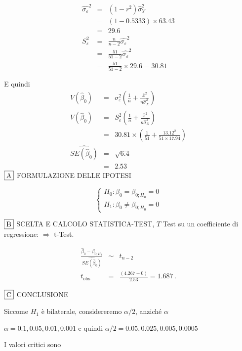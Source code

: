 \documentclass[
  11pt,
]{book}
\theoremstyle{mytheoremstyle}
\theoremstyle{mydefstyle}
\newenvironment{sol}
  {
  \begin{tcolorbox}[enhanced,breakable,arc=0.1mm,boxrule=1pt,colback=white,colframe=iblue,
  title=\bf \fontfamily{lmss}\selectfont \hspace{.5 cm} Soluzione,drop fuzzy shadow]

}{
\end{tcolorbox}
  }
\begin{document}
\begin{sol}
\begin{eqnarray*}
\hat{\sigma_\varepsilon}^2&=&(1-r^2)\hat\sigma_Y^2\\
&=& (1- 0.5333 )\times 63.43 \\
   &=&  29.6 \\
   S_\varepsilon^2 &=& \frac{n} {n-2} \hat{\sigma_\varepsilon}^2\\
   &=&  \frac{ 51 } { 51 -2} \hat{\sigma_\varepsilon}^2 \\
 &=&  \frac{ 51 } { 51 -2} \times  29.6  =  30.81  
\end{eqnarray*}

E quindi\begin{eqnarray*}
V(\hat\beta_{0}) &=& \sigma_{\varepsilon}^{2} \left( \frac{1} {n}  +  \frac{\bar{x}^{2}} {n \hat{\sigma}^{2}_{X}} \right)\\
\widehat{V(\hat\beta_{0})} &=& S_{\varepsilon}^{2}\left( \frac{1} {n}  +  \frac{\bar{x}^{2}} {n \hat{\sigma}^{2}_{X}} \right)\ \\
 &=&  30.81 \times\left( \frac{1} { 51 }  +  \frac{ 13.12 ^{2}} { 51 \times  17.94 } \right)\\
 \widehat{SE(\hat\beta_{0})}        &=&  \sqrt{ 6.4 }\\
 &=&  2.53 
\end{eqnarray*}
\(\fbox{A}\) FORMULAZIONE DELLE IPOTESI

\[\begin{cases}
   H_0: \beta_0 = \beta_{0;H_0}=0 \\
   H_1: \beta_0 \neq \beta_{0;H_0}=0 
   \end{cases}\]

\(\fbox{B}\) SCELTA E CALCOLO STATISTICA-TEST, \(T\)
Test su un coefficiente di regressione: \(\Rightarrow\) t-Test.

\begin{eqnarray*}
 \frac{\hat\beta_{ 0 } - \beta_{ 0 ;H_0}} {\widehat{SE(\hat\beta_{ 0 })}}&\sim&t_{n-2}\\
   t_{\text{obs}}
&=& \frac{ ( 4.267 -  0 )} { 2.53 }
 =   1.687 \, .
\end{eqnarray*}

\(\fbox{C}\) CONCLUSIONE

Siccome \(H_1\) è bilaterale, considereremo \(\alpha/2\),
anziché \(\alpha\)

\(\alpha=0.1, 0.05, 0.01, 0.001\) e quindi \(\alpha/2=0.05, 0.025, 0.005, 0.0005\)

I valori critici sono


\end{sol}
\end{document}
